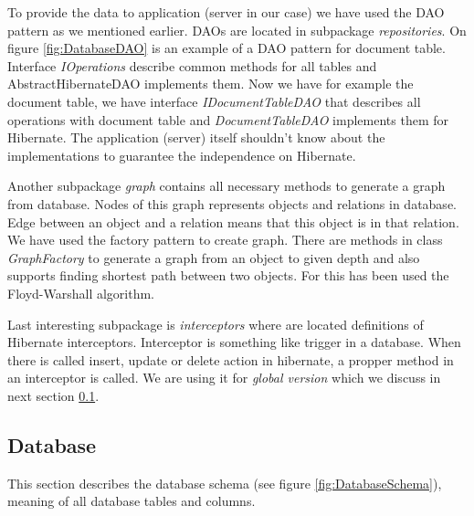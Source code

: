 To provide the data to application (server in our case) we have used the DAO pattern as we mentioned earlier. DAOs are located in subpackage \emph{repositories}. On figure \ref{fig:DatabaseDAO} is an example of a DAO pattern for document table. Interface \emph{IOperations} describe common methods for all tables and AbstractHibernateDAO implements them. Now we have for example the document table, we have interface \emph{IDocumentTableDAO} that describes all operations with document table and \emph{DocumentTableDAO} implements them for Hibernate. The application (server) itself shouldn't know about the implementations to guarantee the independence on Hibernate.

Another subpackage \emph{graph} contains all necessary methods to generate a graph from database. Nodes of this graph represents objects and relations in database. Edge between an object and a relation means that this object is in that relation. We have used the factory pattern to create graph. There are methods in class \emph{GraphFactory} to generate a graph from an object to given depth and also supports finding shortest path between two objects. For this has been used the Floyd-Warshall algorithm. 


Last interesting subpackage is \emph{interceptors} where are located definitions of Hibernate interceptors. Interceptor is something like trigger in a database. When there is called insert, update or delete action in hibernate, a propper method in an interceptor is called. We are using it for \emph{global version} which we discuss in next section \ref{sec:Database}.


\subsection{Database}
\label{sec:Database}

This section describes the database schema (see figure \ref{fig:DatabaseSchema}), meaning of all database tables and columns.


